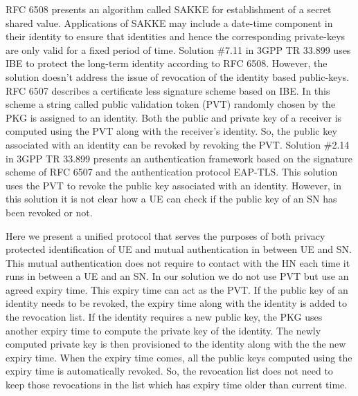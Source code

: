 \documentclass[runningheads,a4paper]{llncs} %
\begin{document}
RFC 6508 \cite{RFC6508} presents an algorithm called SAKKE for establishment of a secret shared value. Applications of SAKKE may include a date-time component in their identity to ensure that identities and hence the corresponding private-keys are only valid for a fixed period of time. 
Solution \#7.11 in 3GPP TR 33.899 \cite{TR33899} uses IBE to protect the long-term identity according to RFC 6508. However, the solution doesn't address the issue of revocation of the identity based public-keys. RFC 6507 \cite{RFC6507} describes a certificate less signature scheme based on IBE. In this scheme a string called public validation token (PVT) randomly chosen by the PKG is assigned to an identity. Both the public and private key of a receiver is computed using the PVT along with the receiver's identity. So, the public key associated with an identity can be revoked by revoking the PVT. Solution \#2.14 in 3GPP TR 33.899 presents an authentication framework based on the signature scheme of RFC 6507 and the authentication protocol EAP-TLS. This solution uses the PVT to revoke the public key associated with an identity. However, in this solution it is not clear how a UE can check if the public key of an SN has been revoked or not.

Here we present a unified protocol that serves the purposes of both privacy protected identification of UE and mutual authentication in between UE and SN. This mutual authentication does not require to contact with the HN each time it runs in between a UE and an SN. In our solution we do not use PVT but use an agreed expiry time. This expiry time can act as the PVT. If the public key of an identity needs to be revoked, the expiry time along with the identity is added to the revocation list. If the identity requires a new public key, the PKG uses another expiry time to compute the private key of the identity. The newly computed private key is then provisioned to the identity along with the the new expiry time. When the expiry time comes, all the public keys computed using the expiry time is automatically revoked. So, the revocation list does not need to keep those revocations in the list which has expiry time older than current time.
\end{document}
